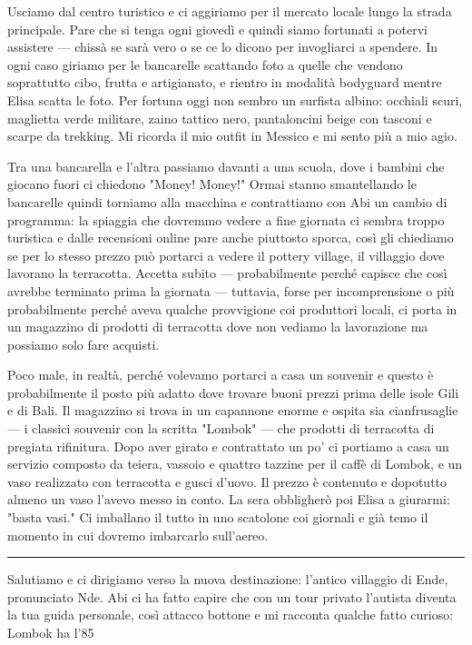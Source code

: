 Usciamo dal centro turistico e ci aggiriamo per il mercato locale lungo la strada principale. Pare che si tenga ogni giovedì e quindi siamo fortunati a potervi assistere — chissà se sarà vero o se ce lo dicono per invogliarci a spendere. In ogni caso giriamo per le bancarelle scattando foto a quelle che vendono soprattutto cibo, frutta e artigianato, e rientro in modalità bodyguard mentre Elisa scatta le foto. Per fortuna oggi non sembro un surfista albino: occhiali scuri, maglietta verde militare, zaino tattico nero, pantaloncini beige con tasconi e scarpe da trekking. Mi ricorda il mio outfit in Messico e mi sento più a mio agio.

Tra una bancarella e l'altra passiamo davanti a una scuola, dove i bambini che giocano fuori ci chiedono "Money! Money!" Ormai stanno smantellando le bancarelle quindi torniamo alla macchina e contrattiamo con Abi un cambio di programma: la spiaggia che dovremmo vedere a fine giornata ci sembra troppo turistica e dalle recensioni online pare anche piuttosto sporca, così gli chiediamo se per lo stesso prezzo può portarci a vedere il pottery village, il villaggio dove lavorano la terracotta. Accetta subito — probabilmente perché capisce che così avrebbe terminato prima la giornata — tuttavia, forse per incomprensione o più probabilmente perché aveva qualche provvigione coi produttori locali, ci porta in un magazzino di prodotti di terracotta dove non vediamo la lavorazione ma possiamo solo fare acquisti.

Poco male, in realtà, perché volevamo portarci a casa un souvenir e questo è probabilmente il posto più adatto dove trovare buoni prezzi prima delle isole Gili e di Bali. Il magazzino si trova in un capannone enorme e ospita sia cianfrusaglie — i classici souvenir con la scritta "Lombok" — che prodotti di terracotta di pregiata rifinitura. Dopo aver girato e contrattato un po' ci portiamo a casa un servizio composto da teiera, vassoio e quattro tazzine per il caffè di Lombok, e un vaso realizzato con terracotta e gusci d'uovo. Il prezzo è contenuto e dopotutto almeno un vaso l'avevo messo in conto. La sera obbligherò poi Elisa a giurarmi: "basta vasi." Ci imballano il tutto in uno scatolone coi giornali e già temo il momento in cui dovremo imbarcarlo sull'aereo.

\begin{center}
    \noindent\rule{0.6\textwidth}{0.4pt}
\end{center}

Salutiamo e ci dirigiamo verso la nuova destinazione: l'antico villaggio di Ende, pronunciato Nde. Abi ci ha fatto capire che con un tour privato l'autista diventa la tua guida personale, così attacco bottone e mi racconta qualche fatto curioso: Lombok ha l'85%

